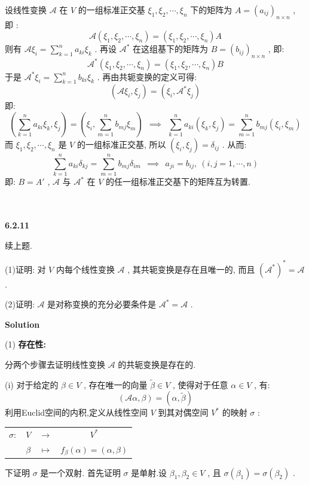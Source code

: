 \documentclass[11pt,a4paper,openany,oneside]{book}
\newcommand\Solution{\noindent\textbf{\textsf{Solution}}\par\medskip}
\begin{document}
设线性变换 $ \mathcal{A} $ 在 $ V $ 的一组标准正交基 $ \xi_1, \xi_2, \cdots, \xi_n $ 下的矩阵为 $ A = (a_{ij})_{n \times n} $ , 即 :
 $$  \mathcal{A}(\xi_1, \xi_2, \cdots, \xi_n) = (\xi_1, \xi_2, \cdots, \xi_n)A  $$ 
则有 $ \mathcal{A}\xi_i = \sum\limits_{k=1}^n a_{ki}\xi_k $ . 再设 $ \mathcal{A}^* $ 在这组基下的矩阵为 $ B = (b_{ij})_{n \times n} $ , 即:
 $$  \mathcal{A}^*(\xi_1, \xi_2, \cdots, \xi_n) = (\xi_1, \xi_2, \cdots, \xi_n)B  $$ 
于是 $ \mathcal{A}^*\xi_i = \sum\limits_{k=1}^n b_{ki}\xi_k $ . 再由共轭变换的定义可得:
 $$  (\mathcal{A}\xi_i, \xi_j) = (\xi_i, \mathcal{A}^*\xi_j)   $$ 
即:
 $$  (\sum\limits_{k=1}^n a_{ki}\xi_k, \xi_j) = (\xi_i, \sum\limits_{m=1}^n b_{mj}\xi_m) \ \ \implies \ \ \sum\limits_{k=1}^n a_{ki}(\xi_k, \xi_j) = \sum\limits_{m=1}^n b_{mj}(\xi_i,\xi_m)  $$ 
而 $ \xi_1, \xi_2, \cdots, \xi_n $ 是 $ V $ 的一组标准正交基, 所以 $ (\xi_i, \xi_j) = \delta_{ij} $ . 从而:
 $$  \sum\limits_{k=1}^n a_{ki}\delta_{kj} = \sum\limits_{m=1}^n b_{mj}\delta_{im} \ \ \implies \ \ a_{ji} = b_{ij}, \ (i,j = 1, \cdots, n) $$ 
即: $ B=A' $ ,  $ \mathcal{A} $ 与 $ \mathcal{A}^* $ 在 $ V $ 的任一组标准正交基下的矩阵互为转置.  \\  \\  \\





\begin{myexample}
	\textbf{6.2.11}

续上题. 

(1)证明: 对 $ V $ 内每个线性变换 $ \mathcal{A} $ , 其共轭变换是存在且唯一的, 而且 $ (\mathcal{A}^*)^* = \mathcal{A} $ .

(2)证明:  $ \mathcal{A} $ 是对称变换的充分必要条件是 $ \mathcal{A}^* = \mathcal{A} $ .\\

\end{myexample}
\Solution 

(1) \textbf{存在性:}

分两个步骤去证明线性变换 $ \mathcal{A} $ 的共轭变换是存在的. 

(i) 对于给定的 $ \beta \in V $ , 存在唯一的向量 $ \widetilde{\beta} \in V $ , 使得对于任意 $ \alpha \in V $ , 有:
 $$  (\mathcal{A}\alpha, \beta) = (\alpha, \widetilde{\beta})  $$ 
利用Euclid空间的内积,定义从线性空间 $ V $ 到其对偶空间 $ V^* $ 的映射 $ \sigma $ :
\begin{center}
	\begin{tabular}{cccc}
		 $ \sigma: $   &   $ V $      &   $ \rightarrow $   &   $ V^* $   \\
		&   $ \beta $  &   $ \mapsto $       &  $ f_{\beta}(\alpha)=(\alpha, \beta) $  
	\end{tabular}
\end{center}
下证明 $ \sigma $ 是一个双射. 首先证明 $ \sigma $ 是单射.设 $ \beta_1, \beta_2 \in V $ , 且 $ \sigma(\beta_1) = \sigma(\beta_2) $ .
\end{document}
